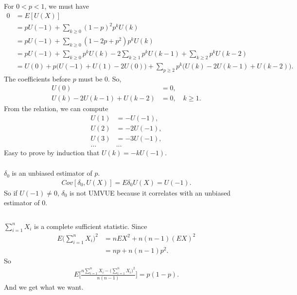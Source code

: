 \subsubsection{} %

For $0<p<1$, we must have
\begin{align}
    0
        &=E[U(X)] \\
        &= p U(-1) + \sum_{k\ge 0} (1-p)^2 p^k U(k) \\
        &= p U(-1) + \sum_{k\ge 0} (1-2p+p^2) p^k U(k) \\
        &= p U(-1) + \sum_{k\ge 0} p^k U(k) - 2 \sum_{k\ge 1} p^k U(k-1) + \sum_{k\ge 2} p^k U(k-2) \\
        &= U(0) + p\big(U(-1)+U(1)-2U(0)\big) + \sum_{p\ge2}p^k\big(U(k) -2U(k-1) +U(k-2)\big).
\end{align}
The coefficients before $p$ must be $0$. So,
\begin{align}
    U(0) &= 0, \\
    U(k) -2U(k-1) +U(k-2) &= 0, \quad k\ge 1.
\end{align}
From the relation, we can compute
\begin{align}
    U(1) &= -U(-1), \\
    U(2) &= -2U(-1), \\
    U(3) &= -3U(-1), \\
    \dots&\dots
\end{align}
Easy to prove by induction that $U(k)=-kU(-1)$.

\subsubsection{} %

$\delta_0$ is an unbiased estimator of $p$.
\begin{align}
    Cov[\delta_0, U(X)] = E \delta_0 U(X) = U(-1).
\end{align}
So if $U(-1)\ne 0$, $\delta_0$ is not UMVUE because it correlates with
an unbiased estimator of $0$.

\subsection{} %

$\sum_{i=1}^n X_i$ is a complete sufficient statistic.
Since
\begin{align}
    E \Big(\sum_{i=1}^n X_i\Big)^2
        &= n E X^2 + n(n-1) (E X)^2 \\
        &= np + n(n-1)p^2.
\end{align}
So
\begin{align}
    E \Bigg[\frac{n \sum_{i=1}^n X_i - \Big(\sum_{i=1}^n X_i\Big)^2 }{n(n-1)}\Bigg] = p(1-p).
\end{align}
And we get what we want.

